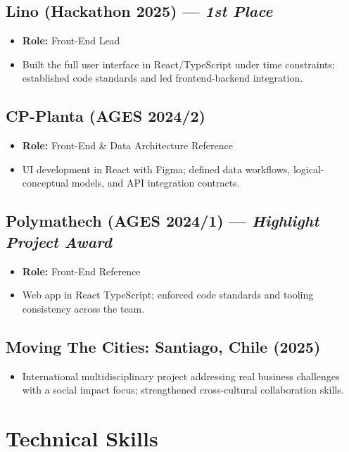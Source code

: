 \documentclass[a4paper,10pt]{article}
\begin{document}
\subsection*{Lino (Hackathon 2025) --- \textit{1st Place}}
\begin{itemize}[leftmargin=1cm]
    \item \textbf{Role:} Front-End Lead
    \item Built the full user interface in React/TypeScript under time constraints; established code standards and led frontend-backend integration.
\end{itemize}

\subsection*{CP-Planta (AGES 2024/2)}
\begin{itemize}[leftmargin=1cm]
    \item \textbf{Role:} Front-End \& Data Architecture Reference
    \item UI development in React with Figma; defined data workflows, logical-conceptual models, and API integration contracts.
\end{itemize}

\subsection*{Polymathech (AGES 2024/1) --- \textit{Highlight Project Award}}
\begin{itemize}[leftmargin=1cm]
    \item \textbf{Role:} Front-End Reference
    \item Web app in React TypeScript; enforced code standards and tooling consistency across the team.
\end{itemize}

\subsection*{Moving The Cities: Santiago, Chile (2025)}
\begin{itemize}[leftmargin=1cm]
    \item International multidisciplinary project addressing real business challenges with a social impact focus; strengthened cross-cultural collaboration skills.
\end{itemize}

\section*{Technical Skills}
\end{document}
